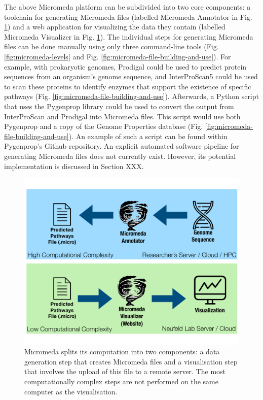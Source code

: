 The above Micromeda platform can be subdivided into two core components: a toolchain for generating Micromeda files (labelled Micromeda Annotator in Fig. \ref{fig:micromeda-file-generation}) and a web application for visualizing the data they contain (labelled Micromeda Visualizer in Fig. \ref{fig:micromeda-file-generation}). The individual steps for generating Micromeda files can be done manually using only three command-line tools (Fig. \ref{fig:micromeda-levels} and Fig. \ref{fig:micromeda-file-building-and-use}). For example, with prokaryotic genomes, Prodigal could be used to predict protein sequences from an organism's genome sequence, and InterProScan5 could be used to scan these proteins to identify enzymes that support the existence of specific pathways (Fig. \ref{fig:micromeda-file-building-and-use}). Afterwards, a Python script that uses the Pygenprop library could be used to convert the output from InterProScan and Prodigal into Micromeda files. This script would use both Pygenprop and a copy of the Genome Properties database (Fig. \ref{fig:micromeda-file-building-and-use}). An example of such a script can be found within Pygenprop's Github repository. An explicit automated software pipeline for generating Micromeda files does not currently exist. However, its potential implementation is discussed in Section XXX.

\begin{figure}[!ht]
  \centering
	\includegraphics[width=\textwidth]{media/micromeda-file-generation.pdf}
	 \caption{Micromeda splits its computation into two components: a data generation step that creates Micromeda files and a visualisation step that involves the upload of this file to a remote server. The most computationally complex steps are not performed on the same computer as the visualisation.}
	 \label{fig:micromeda-file-generation}
\end{figure}

